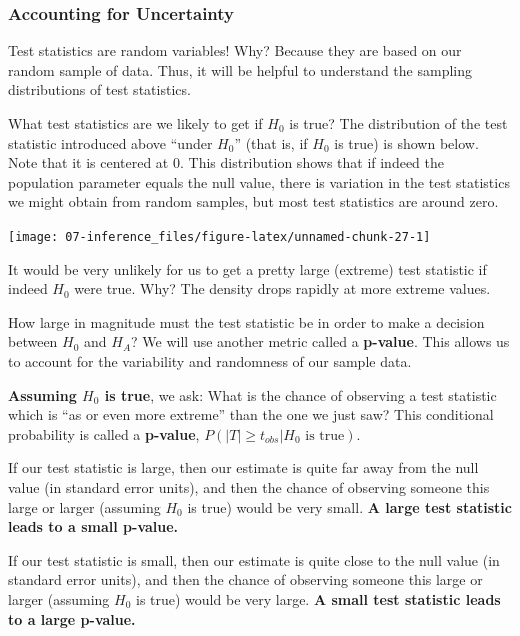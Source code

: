 \documentclass[
]{book}
\begin{document}
\subsubsection{Accounting for Uncertainty}\label{accounting-for-uncertainty}

Test statistics are random variables! Why? Because they are based on our random sample of data. Thus, it will be helpful to understand the sampling distributions of test statistics.

What test statistics are we likely to get if \(H_0\) is true? The distribution of the test statistic introduced above ``under \(H_0\)'' (that is, if \(H_0\) is true) is shown below. Note that it is centered at 0. This distribution shows that if indeed the population parameter equals the null value, there is variation in the test statistics we might obtain from random samples, but most test statistics are around zero.

\begin{center}\texttt{[image: 07-inference\_files/figure-latex/unnamed-chunk-27-1]} \end{center}

It would be very unlikely for us to get a pretty large (extreme) test statistic if indeed \(H_0\) were true. Why? The density drops rapidly at more extreme values.

How large in magnitude must the test statistic be in order to make a decision between \(H_0\) and \(H_A\)? We will use another metric called a \textbf{p-value}. This allows us to account for the variability and randomness of our sample data.

\textbf{Assuming \(H_0\) is true}, we ask: What is the chance of observing a test statistic which is ``as or even more extreme'' than the one we just saw? This conditional probability is called a \textbf{p-value}, \(P(|T| \geq t_{obs} | H_0\text{ is true})\).

If our test statistic is large, then our estimate is quite far away from the null value (in standard error units), and then the chance of observing someone this large or larger (assuming \(H_0\) is true) would be very small. \textbf{A large test statistic leads to a small p-value.}

If our test statistic is small, then our estimate is quite close to the null value (in standard error units), and then the chance of observing someone this large or larger (assuming \(H_0\) is true) would be very large. \textbf{A small test statistic leads to a large p-value.}
\end{document}

